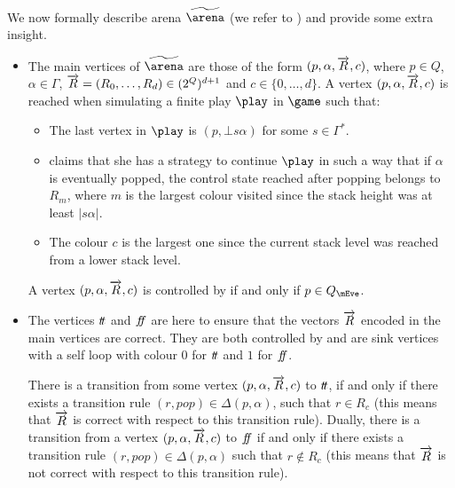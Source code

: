 We now formally describe arena
$\farena$ (we refer to ) and provide some extra insight.

\begin{itemize}
\item The main vertices of $\farena$ are those of the form
$(p,\alpha,\overrightarrow{R},c)$, where $p\in Q$, $\alpha\in
\Gamma$, $\overrightarrow{R}=(R_0,\dots,R_d)\in
(2^Q)^{d+1}$ and $c\in\{0,\dots,d\}$. A vertex $(p,\alpha,\overrightarrow{R},c)$ is reached when
simulating a finite play $\play$ in $\game$ such that:
\begin{itemize}

\item The last vertex in $\play$ is $(p,\bot s\alpha)$ for some $s\in \Gamma^*$.

\item \Eve claims that she has a strategy to continue $\play$ in such
  a way that if $\alpha$ is eventually popped, the control state
  reached after popping belongs to $R_m$, where $m$ is
  the largest colour visited since the stack height was at least $|s\alpha|$.

\item The colour $c$ is the largest one since the current stack level was reached from a lower stack level.
\end{itemize}

A vertex $(p,\alpha,\overrightarrow{R},c)$ is controlled by \Eve if
and only if $p\in Q_\mEve$.

\item The vertices $t\! t$ and $f\!\! f$ are here to ensure
  that the vectors $\overrightarrow{R}$ encoded in the main vertices are correct. They are both controlled by \Eve and are sink vertices with a self loop with colour $0$ for $t\! t$ and $1$ for $f\!\! f$.

There is a transition from some vertex
$(p,\alpha,\overrightarrow{R},c)$ to $t\! t$, if and
only if there exists a transition rule $(r,pop)\in\Delta(p,\alpha)$,
such that $r\in R_{c}$ (this means that $\overrightarrow{R}$ is correct with respect
to this transition rule).
Dually, there is a transition from a vertex
$(p,\alpha,\overrightarrow{R},c)$ to $f\!\! f$
if and only if there exists a transition rule
$(r,pop)\in\Delta(p,\alpha)$ such that $r\notin R_{c}$ (this means that
$\overrightarrow{R}$ is not correct with respect to this transition rule).



\end{itemize}
